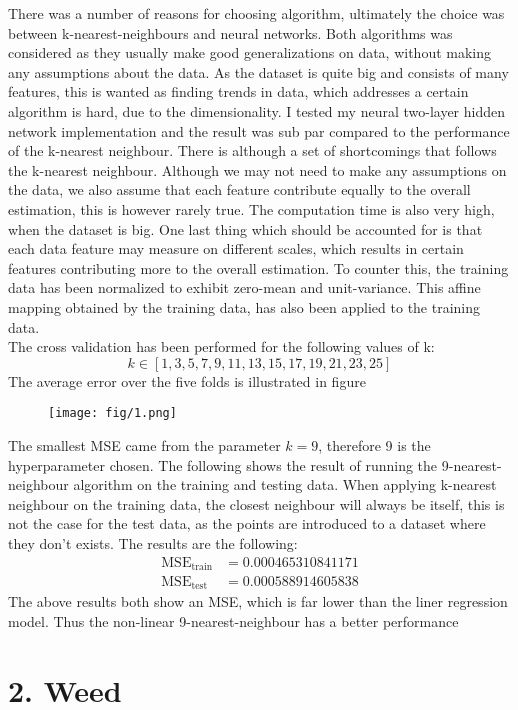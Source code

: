 \documentclass{article}
\begin{document}
There was a number of reasons for choosing algorithm, ultimately the choice was between k-nearest-neighbours and neural networks. Both algorithms was considered as they usually make good generalizations on data, without making any assumptions about the data. As the dataset is quite big and consists of many features, this is wanted as finding trends in data, which addresses a certain algorithm is hard, due to the dimensionality. I tested my neural two-layer hidden network implementation and the result was sub par compared to the performance of  the k-nearest neighbour. There is although a set of shortcomings that follows the k-nearest neighbour. Although we may not need to make any assumptions on the data, we also assume that each feature contribute equally to the overall estimation, this is however rarely true. The computation time is also very high, when the dataset is big. One last thing which should be accounted for is that each data feature may measure on different scales, which results in certain features contributing more to the overall estimation. To counter this, the training data has been normalized to exhibit zero-mean and unit-variance. This affine mapping obtained by the training data, has also been applied to the training data. \\
The cross validation has been performed for the following values of k:
$$ k \in \left[ 1,3,5,7,9,11,13,15,17,19,21,23,25 \right] $$
The average error over the five folds is illustrated in figure 

\begin{figure}[H]
  \centering
  \texttt{[image: fig/1.png]}
  \caption{}
  \label{fig:mulplots}
\end{figure}
The smallest MSE came from the parameter $k=9$, therefore 9 is the hyperparameter chosen. The following shows the result of running the 9-nearest-neighbour algorithm on the training and testing data. When applying k-nearest neighbour on the training data, the closest neighbour will always be itself, this is not the case for the test data, as the points are introduced to a dataset where they don't exists. The results are the following:
\begin{align*}
\text{MSE}_{\text{train}} &=  0.000465310841171 \\
\text{MSE}_{\text{test}} &=  0.000588914605838
\end{align*}
The above results both show an MSE, which is far lower than the liner regression model. Thus the non-linear 9-nearest-neighbour has a better performance %
\section{2. Weed}
\end{document}
